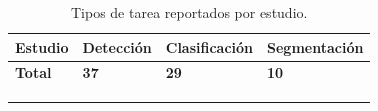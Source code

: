 \begingroup
\newcommand{\marca}{\(\times\)}

\setlength{\tabcolsep}{2pt}
\renewcommand{\arraystretch}{1.05}
\tiny

\begin{xltabular}{\textwidth}{>{\raggedright\arraybackslash}X *{3}{>{\centering\arraybackslash}p{2.5cm}}}
\caption{Tipos de tarea reportados por estudio.}
\label{tab:rq1-tipos-tarea} \\

\hline
\textbf{Estudio} &
\textbf{Detección} &
\textbf{Clasificación} &
\textbf{Segmentación} \\
\hline
\endfirsthead

\endhead

\hline
\endfoot

\hline
\textbf{Total} & \textbf{37} & \textbf{29} & \textbf{10} \\
\hline
\\
 \\
\endlastfoot


\end{xltabular}

